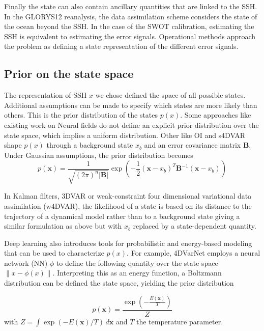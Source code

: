 \begin{bibunit}
Finally the state can also contain ancillary quantities that are linked to the SSH. In the GLORYS12\cite{lelloucheCopernicusGlobal122021} reanalysis, the data assimilation scheme considers the state of the ocean beyond the SSH. 
In the case of the SWOT calibration, estimating the SSH is equivalent to estimating the error signals. Operational methods\cite{dibarboureDataDrivenCalibrationAlgorithm2022} approach the problem as defining a state representation of the different error signals.

\subsection*{Prior on the state space}
The representation of SSH $x$ we chose defined the space of all possible states. Additional assumptions can be made to specify which states are more likely than others. This is the prior distribution of the states $p(x)$.
Some approaches like existing work on Neural fields\cite{johnsonNeuralFieldsFast2022} do not define an explicit prior distribution over the state space, which implies a uniform distribution.
Other like OI and s4DVAR shape $p(x)$ through a background state $x_b$ and an error covariance matrix $\mathbf{B}$. Under Gaussian assumptions, the prior distribution becomes 
\begin{equation}
p(\mathbf{x}) = \frac{1}{\sqrt{(2\pi)^n |\mathbf{B}|}} \exp\left(-\frac{1}{2} (\mathbf{x} - x_b)^T \mathbf{B}^{-1} (\mathbf{x} - x_b)\right)
    \label{eq:background}
\end{equation}

In Kalman filters, 3DVAR or weak-constraint four dimensional variational data assimilation (w4DVAR)\cite{carrassiDataAssimilationGeosciences2018}, the likelihood of a state is based on its distance to the trajectory of a dynamical model rather than to a background state giving a similar formulation as above but with $x_b$ replaced by a state-dependent quantity.

Deep learning also introduces tools for probabilistic and energy-based modeling that can be used to characterize $p(x)$.
 For example, 4DVarNet employs a neural network (NN) $\phi$ to define the following quantity over the state space $\| x - \phi(x)\|$. Interpreting this as an energy function, a Boltzmann distribution can be defined the state space, yielding the prior distribution

  \begin{equation}
 p(\mathbf{x}) = \frac{\exp(-\frac{E(\mathbf{x})}{T})}{Z}
    \label{eq:boltzmann}
  \end{equation}
 with $Z = \int \exp(-E(\mathbf{x}) / T) \, d\mathbf{x}$ and $T$ the temperature parameter.




\end{bibunit}
